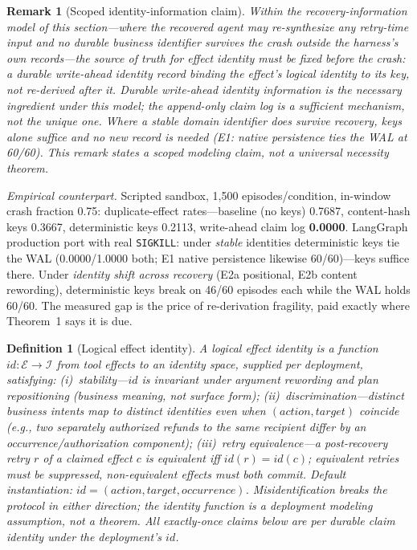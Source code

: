\documentclass[10pt,journal,compsoc]{IEEEtran}
\newtheorem{definition}{Definition}
\newtheorem{remark}{Remark}
\begin{document}
\begin{remark}[Scoped identity-information claim]
Within the recovery-information model of this
section---where the recovered agent may re-synthesize any
retry-time input and no durable business identifier survives
the crash outside the harness's own records---the source of
truth for effect identity must be fixed \emph{before} the
crash: a durable write-ahead identity record binding the
effect's logical identity to its key, not re-derived after it.
Durable write-ahead identity \emph{information} is the necessary
ingredient \emph{under this model}; the append-only claim log
is a sufficient mechanism, not the unique one. Where a stable
domain identifier does survive recovery, keys alone suffice and
no new record is needed (E1: native persistence ties the WAL at
60/60). This remark states a scoped modeling claim, not a
universal necessity theorem.
\end{remark}

\emph{Empirical counterpart.} Scripted sandbox, 1,500
episodes/condition, in-window crash fraction 0.75:
duplicate-effect rates---baseline (no keys) 0.7687,
content-hash keys 0.3667, deterministic keys 0.2113,
write-ahead claim log \textbf{0.0000}. LangGraph production
port with real \texttt{SIGKILL}: under \emph{stable} identities
deterministic keys tie the WAL (0.0000/1.0000 both; E1 native
persistence likewise 60/60)---keys suffice there. Under
\emph{identity shift across recovery} (E2a positional, E2b
content rewording), deterministic keys break on 46/60 episodes
each while the WAL holds 60/60. The measured gap is the price
of re-derivation fragility, paid exactly where Theorem~1 says
it is due.

\begin{definition}[Logical effect identity]
A \emph{logical effect identity} is a function
$\mathit{id}: \mathcal{E} \to \mathcal{I}$ from tool effects to
an identity space, supplied per deployment, satisfying:
(i)~\emph{stability}---$\mathit{id}$ is invariant under argument
rewording and plan repositioning (business meaning, not surface
form); (ii)~\emph{discrimination}---distinct business intents
map to distinct identities even when $(\mathit{action},
\mathit{target})$ coincide (e.g., two separately authorized
refunds to the same recipient differ by an
occurrence/authorization component); (iii)~\emph{retry
equivalence}---a post-recovery retry $r$ of a claimed effect $c$
is \emph{equivalent} iff $\mathit{id}(r) = \mathit{id}(c)$;
equivalent retries must be suppressed, non-equivalent effects
must both commit. Default instantiation:
$\mathit{id} = (\mathit{action}, \mathit{target},
\mathit{occurrence})$. Misidentification breaks the protocol in
either direction; the identity function is a deployment
modeling assumption, not a theorem. All exactly-once claims
below are per \emph{durable claim identity} under the
deployment's $\mathit{id}$.
\end{definition}
\end{document}

